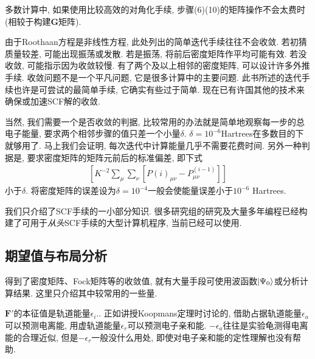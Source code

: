 多数计算中, 如果使用比较高效的对角化手续, 步骤(6)(10)的矩阵操作不会太费时(相较于构建$\mathbf{G}$矩阵).

由于Roothaan方程是非线性方程, 此处列出的简单迭代手续往往不会收敛. 若初猜质量较差, 可能出现振荡或发散. 若是振荡, 将前后密度矩阵作平均可能有效. 若没收敛, 可能指示因为收敛较慢. 有了两个及以上相邻的密度矩阵, 可以设计许多外推手续. 收敛问题不是一个平凡问题, 它是很多计算中的主要问题. 此书所述的迭代手续也许是可尝试的最简单手续, 它确实有些过于简单. 现在已有许国其他的技术来确保或加速SCF解的收敛.

当然, 我们需要一个是否收敛的判据, 比较常用的办法就是简单地观察每一步的总电子能量, 要求两个相邻步骤的值只差一个小量$\delta$. $\delta=10^{-6}$Hartrees在多数目的下就够用了. 马上我们会证明, 每次迭代中计算能量几乎不需要花费时间. 另外一种判据是, 要求密度矩阵的矩阵元前后的标准偏差, 即下式
\begin{align*}
\left[ K^{-2}\sum_\mu\sum_\nu[P{(i)}_{\mu\nu}-P^{(i-1)}_{\mu\nu} ] \right]
\end{align*} 
小于$\delta$. 将密度矩阵的误差设为$\delta=10^{-4}$一般会使能量误差小于$10^{-6}$ Hartrees.

我们只介绍了SCF手续的一小部分知识. 很多研究组的研究及大量多年编程已经构建了可用于\emph{从头}SCF手续的大型计算机程序, 当前已经可以使用.
\subsection{期望值与布局分析}
得到了密度矩阵、Fock矩阵等的收敛值, 就有大量手段可使用波函数$\Ket{\Psi_0}$或分析计算结果. 这里只介绍其中较常用的一些量.

$\mathbf{F'}$的本征值是轨道能量$\epsilon_i$.. 正如讲授Koopmans定理时讨论的, 借助占据轨道能量$\epsilon_a$可以预测电离能, 用虚轨道能量$\epsilon_r$可以预测电子亲和能. $-\epsilon_a$往往是实验龟测得电离能的合理近似, 但是$-\epsilon_r$一般没什么用处, 即使对电子亲和能的定性理解也没有帮助.

